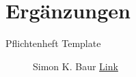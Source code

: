 \section{Ergänzungen}


\begin{description}
	\item[Pflichtenheft Template]
	Simon K. Baur
	\href{http://www.linux-magazin.de/Media/Linux-Magazin/Files/latex}{Link}
\end{description}
